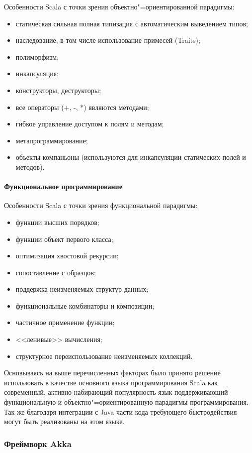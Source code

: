Особенности Scala с точки зрения объектно"=ориентированной парадигмы:
\begin{itemize}
  \item статическая сильная полная типизация с автоматическим выведением типов;
  \item наследование, в том числе использование примесей (Traits);
  \item полиморфизм;
  \item инкапсуляция;
  \item конструкторы, деструкторы;
  \item все операторы (+, -, *) являются методами;
  \item гибкое управление доступом к полям и методам;
  \item метапрограммирование;
  \item объекты компаньоны (используются для инкапсуляции статических полей и методов).
\end{itemize}

\paragraph{Функциональное программирование}
Особенности Scala с точки зрения функциональной парадигмы:
\begin{itemize}
  \item функции высших порядков;
  \item функции объект первого класса;
  \item оптимизация хвостовой рекурсии;
  \item сопоставление с образцов;
  \item поддержка неизменяемых структур данных;
  \item функциональные комбинаторы и композиции;
  \item частичное применение функции;
  \item <<ленивые>> вычисления;
  \item структурное переиспользование неизменяемых коллекций.
\end{itemize}

Основываясь на выше перечисленных факторах было принято решение использовать в качестве основного языка программирования Scala как современный, активно набирающий популярность язык поддерживающий функциональную и объектно"=ориентированную парадигмы программирования. Так же благодаря интеграции с Java части кода требующего быстродействия могут быть реализованы на этом языке.

\subsubsection{Фреймворк Akka}
\label{sec:techs:akka}

